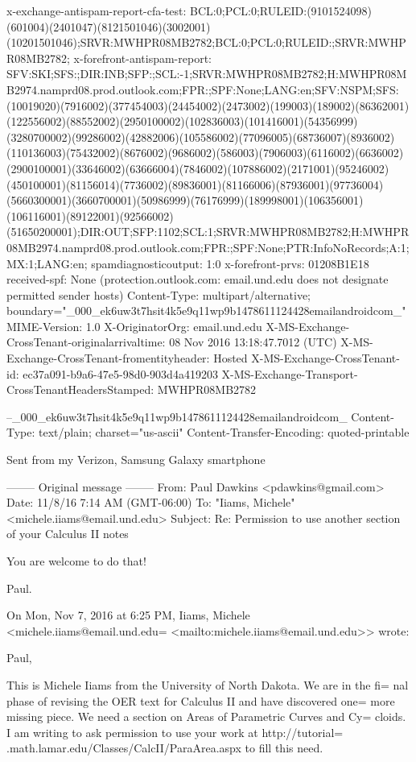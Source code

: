 x-exchange-antispam-report-cfa-test: BCL:0;PCL:0;RULEID:(9101524098)(601004)(2401047)(8121501046)(3002001)(10201501046);SRVR:MWHPR08MB2782;BCL:0;PCL:0;RULEID:;SRVR:MWHPR08MB2782;
x-forefront-antispam-report: SFV:SKI;SFS:;DIR:INB;SFP:;SCL:-1;SRVR:MWHPR08MB2782;H:MWHPR08MB2974.namprd08.prod.outlook.com;FPR:;SPF:None;LANG:en;SFV:NSPM;SFS:(10019020)(7916002)(377454003)(24454002)(2473002)(199003)(189002)(86362001)(122556002)(88552002)(2950100002)(102836003)(101416001)(54356999)(3280700002)(99286002)(42882006)(105586002)(77096005)(68736007)(8936002)(110136003)(75432002)(8676002)(9686002)(586003)(7906003)(6116002)(6636002)(2900100001)(33646002)(63666004)(7846002)(107886002)(2171001)(95246002)(450100001)(81156014)(7736002)(89836001)(81166006)(87936001)(97736004)(5660300001)(3660700001)(50986999)(76176999)(189998001)(106356001)(106116001)(89122001)(92566002)(51650200001);DIR:OUT;SFP:1102;SCL:1;SRVR:MWHPR08MB2782;H:MWHPR08MB2974.namprd08.prod.outlook.com;FPR:;SPF:None;PTR:InfoNoRecords;A:1;MX:1;LANG:en;
spamdiagnosticoutput: 1:0
x-forefront-prvs: 01208B1E18
received-spf: None (protection.outlook.com: email.und.edu does not designate permitted sender hosts)
Content-Type: multipart/alternative; boundary="_000_ek6uw3t7hsit4k5e9q11wp9b1478611124428emailandroidcom_"
MIME-Version: 1.0
X-OriginatorOrg: email.und.edu
X-MS-Exchange-CrossTenant-originalarrivaltime: 08 Nov 2016 13:18:47.7012 (UTC)
X-MS-Exchange-CrossTenant-fromentityheader: Hosted
X-MS-Exchange-CrossTenant-id: ec37a091-b9a6-47e5-98d0-903d4a419203
X-MS-Exchange-Transport-CrossTenantHeadersStamped: MWHPR08MB2782

--_000_ek6uw3t7hsit4k5e9q11wp9b1478611124428emailandroidcom_
Content-Type: text/plain; charset="us-ascii"
Content-Transfer-Encoding: quoted-printable





Sent from my Verizon, Samsung Galaxy smartphone


-------- Original message --------
From: Paul Dawkins <pdawkins@gmail.com>
Date: 11/8/16 7:14 AM (GMT-06:00)
To: "Iiams, Michele" <michele.iiams@email.und.edu>
Subject: Re: Permission to use another section of your Calculus II notes

You are welcome to do that!

Paul.

On Mon, Nov 7, 2016 at 6:25 PM, Iiams, Michele <michele.iiams@email.und.edu=
<mailto:michele.iiams@email.und.edu>> wrote:

Paul,


This is Michele Iiams from the University of North Dakota. We are in the fi=
nal phase of revising  the OER text for Calculus II and have discovered one=
 more missing piece. We need a section on Areas of Parametric Curves and Cy=
cloids. I am writing to ask permission to use your work at  http://tutorial=
.math.lamar.edu/Classes/CalcII/ParaArea.aspx to fill this need.


